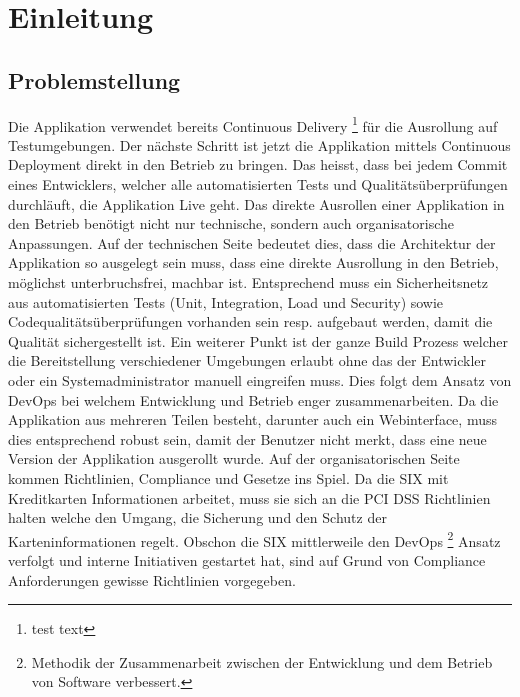 \chapter{Einleitung}

\section{Problemstellung}

Die Applikation verwendet bereits Continuous Delivery \footnote{test text} für die Ausrollung auf Testumgebungen. Der nächste Schritt ist jetzt die Applikation mittels Continuous Deployment direkt in den Betrieb zu bringen. Das heisst, dass bei jedem Commit eines Entwicklers, welcher alle automatisierten Tests und Qualitätsüberprüfungen durchläuft, die Applikation Live geht.
Das direkte Ausrollen einer Applikation in den Betrieb benötigt nicht nur technische, sondern auch organisatorische Anpassungen. 
Auf der technischen Seite bedeutet dies, dass die Architektur der Applikation so ausgelegt sein muss, dass eine direkte Ausrollung in den Betrieb, möglichst unterbruchsfrei, machbar ist. Entsprechend muss ein Sicherheitsnetz aus automatisierten Tests (Unit, Integration, Load und Security) sowie Codequalitätsüberprüfungen vorhanden sein resp. aufgebaut werden, damit die Qualität sichergestellt ist. Ein weiterer Punkt ist der ganze Build Prozess welcher die Bereitstellung verschiedener Umgebungen erlaubt ohne das der Entwickler oder ein Systemadministrator manuell eingreifen muss. Dies folgt dem Ansatz von DevOps bei welchem Entwicklung und Betrieb enger zusammenarbeiten. Da die Applikation aus mehreren Teilen besteht, darunter auch ein Webinterface, muss dies entsprechend robust sein, damit der Benutzer nicht merkt, dass eine neue Version der Applikation ausgerollt wurde.
Auf der organisatorischen Seite kommen Richtlinien, Compliance und Gesetze ins Spiel. Da die SIX mit Kreditkarten Informationen arbeitet, muss sie sich an die PCI DSS Richtlinien halten welche den Umgang, die Sicherung und den Schutz der Karteninformationen regelt. Obschon die SIX mittlerweile den DevOps \footnote{Methodik der Zusammenarbeit zwischen der Entwicklung und dem Betrieb von Software verbessert. } Ansatz verfolgt und interne Initiativen gestartet hat, sind auf Grund von Compliance Anforderungen gewisse Richtlinien vorgegeben.

